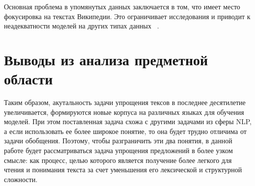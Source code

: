 Основная проблема в упомянутых данных заключается в том, что имеет место фокусировка на текстах Википедии. Это ограничивает исследования и приводит к неадекватности моделей на других типах данных ~\cite{kazan_federal_university}. 



\section*{Выводы из анализа предметной области}

Таким образом, акутальность задачи упрощения тексов в последнее десятилетие увеличивается, формируются новые корпуса на различных языках для обучения моделей.  При этом поставленная задача схожа с другими задачами из сферы NLP, а если использовать ее более широкое понятие, то она будет трудно отличима от задачи обобщения. Поэтому, чтобы разграничить эти два понятия, в данной работе будет рассматриваться задача упрощения предложений в более узком смысле: как процесс, целью которого является получение более легкого для чтения и понимания текста за счет уменьшения его лексической и структурной сложности\cite{martin_muss_2021}.
